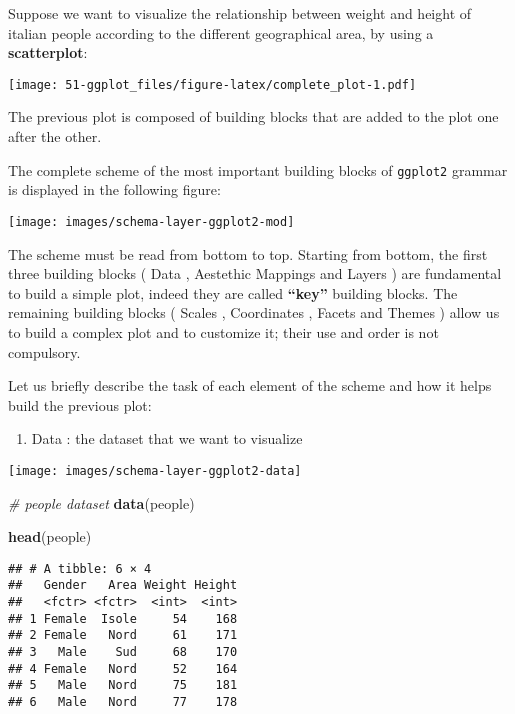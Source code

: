 \documentclass[]{book}
\newenvironment{Shaded}{\begin{snugshade}}{\end{snugshade}}
\newcommand{\KeywordTok}[1]{\textcolor[rgb]{0.13,0.29,0.53}{\textbf{{#1}}}}
\newcommand{\CommentTok}[1]{\textcolor[rgb]{0.56,0.35,0.01}{\textit{{#1}}}}
\newcommand{\NormalTok}[1]{{#1}}
\providecommand{\tightlist}{%
  \setlength{\itemsep}{0pt}\setlength{\parskip}{0pt}}
\def\tightlist{}
\begin{document}
Suppose we want to visualize the relationship between weight and height
of italian people according to the different geographical area, by using
a \textbf{scatterplot}:

\texttt{[image: 51-ggplot\_files/figure-latex/complete\_plot-1.pdf]}

The previous plot is composed of building blocks that are added to the
plot one after the other.

The complete scheme of the most important building blocks of
\texttt{ggplot2} grammar is displayed in the following figure:

\texttt{[image: images/schema-layer-ggplot2-mod]}

The scheme must be read from bottom to top. Starting from bottom, the
first three building blocks ( {Data} , {Aestethic Mappings} and {Layers}
) are fundamental to build a simple plot, indeed they are called
\textbf{``key''} building blocks. The remaining building blocks (
{Scales} , {Coordinates} , {Facets} and {Themes} ) allow us to build a
complex plot and to customize it; their use and order is not compulsory.

Let us briefly describe the task of each element of the scheme and how
it helps build the previous plot:

\begin{enumerate}
\def\labelenumi{\arabic{enumi}.}
\tightlist
\item
   {Data} : the dataset that we want to visualize
\end{enumerate}

\texttt{[image: images/schema-layer-ggplot2-data]}

\begin{Shaded}
\begin{Highlighting}[]
\CommentTok{# people dataset}
\KeywordTok{data}\NormalTok{(people)}
\end{Highlighting}
\end{Shaded}

\begin{Shaded}
\begin{Highlighting}[]
\KeywordTok{head}\NormalTok{(people)}
\end{Highlighting}
\end{Shaded}

\begin{verbatim}
## # A tibble: 6 × 4
##   Gender   Area Weight Height
##   <fctr> <fctr>  <int>  <int>
## 1 Female  Isole     54    168
## 2 Female   Nord     61    171
## 3   Male    Sud     68    170
## 4 Female   Nord     52    164
## 5   Male   Nord     75    181
## 6   Male   Nord     77    178
\end{verbatim}
\end{document}
